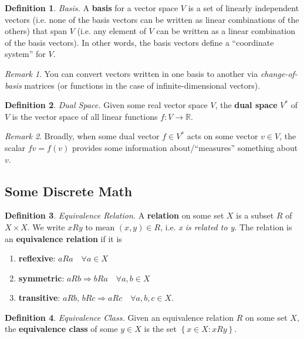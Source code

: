 \documentclass[10pt,landscape]{article}
\theoremstyle{definition}
\newtheorem{definition}{Definition}[section]
\theoremstyle{theorem}
\theoremstyle{summary}
\theoremstyle{remark}
\newtheorem*{remark}{Remark}
\newcommand{\R}{\mathbb{R}}
\begin{document}
\begin{multicols*}{3}
\theoremstyle{definition}
\begin{definition}{\textit{Basis.}}
A \textbf{basis} for a vector space $V$ is a set of linearly independent vectors (i.e. none of the basis vectors can be written as linear combinations of the others) that span $V$ (i.e. any element of $V$ can be written as a linear combination of the basis vectors). In other words, the basis vectors define a ``coordinate system'' for $V$.
\end{definition}

\begin{remark}
You can convert vectors written in one basis to another via \textit{change-of-basis} matrices (or functions in the case of infinite-dimensional vectors).
\end{remark}

\theoremstyle{definition}
\begin{definition}{\textit{Dual Space.}}
Given some real vector space $V$, the \textbf{dual space} $V^*$ of $V$ is the vector space of all linear functions $f:V\rightarrow\R$.
\end{definition}

\begin{remark}
    Broadly, when some dual vector $f\in V^*$ acts on some vector $v\in V$, the scalar $fv=f(v)$ provides some information about/``measures'' something about $v$.
\end{remark}


\subsection{Some Discrete Math}
\begin{definition}{\textit{Equivalence Relation.}}
A \textbf{relation} on some set $X$ is a subset $R$ of $X\times X$. We write $x R y$ to mean $(x, y)\in R$, i.e. \textit{x is related to y}.
The relation is an \textbf{equivalence relation} if it is
\begin{enumerate}
    \item \textbf{reflexive}: $aRa \quad \forall a\in X$
    \item \textbf{symmetric}: $aRb \Rightarrow bRa \quad \forall a,b\in X$
    \item \textbf{transitive}: $aRb,\, bRc \Rightarrow aRc \quad \forall a,b,c\in X$.
\end{enumerate}
\end{definition}

\begin{definition}{\textit{Equivalence Class.}}
Given an equivalence relation $R$ on some set $X$, the \textbf{equivalence class} of some $y\in X$ is the set $\left\{x\in X: xRy\right\}$.
\end{definition}


\end{multicols*}
\end{document}
